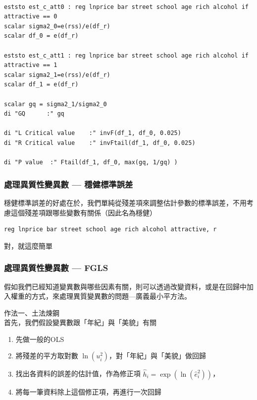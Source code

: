 \begin{frame}[fragile]
    \begin{lstlisting}
    
eststo est_c_att0 : reg lnprice bar street school age rich alcohol if attractive == 0
scalar sigma2_0=e(rss)/e(df_r)
scalar df_0 = e(df_r)

eststo est_c_att1 : reg lnprice bar street school age rich alcohol if attractive == 1
scalar sigma2_1=e(rss)/e(df_r)
scalar df_1 = e(df_r)

scalar gq = sigma2_1/sigma2_0
di "GQ      :" gq

di "L Critical value    :" invF(df_1, df_0, 0.025)
di "R Critical value    :" invFtail(df_1, df_0, 0.025)

di "P value  :" Ftail(df_1, df_0, max(gq, 1/gq) )
    \end{lstlisting}

\end{frame}

\begin{frame}[fragile]
    \frametitle{處理異質性變異數 --- 穩健標準誤差}

    穩健標準誤差的好處在於，我們單純從殘差項來調整估計參數的標準誤差，不用考慮這個殘差項跟哪些變數有關係（因此名為穩健）

\begin{lstlisting}
reg lnprice bar street school age rich alcohol attractive, r 
\end{lstlisting}
\vfill
對，就這麼簡單
\end{frame}

\begin{frame}
        \begin{table}
            \centering
            \scalebox{0.7}{
            
            }
        \end{table}
\end{frame}

\begin{frame}
    \frametitle{處理異質性變異數 --- FGLS}
    假如我們已經知道變異數與哪些因素有關，則可以透過改變資料，或是在回歸中加入權重的方式，來處理異質變異數的問題---廣義最小平方法。

    作法一、土法煉鋼\\
    首先，我們假設變異數跟「年紀」與「美貌」有關
    \begin{enumerate}
        \item 先做一般的OLS
        \item 將殘差的平方取對數 $\ln(u_i^2)$，對「年紀」與「美貌」做回歸
        \item 找出各資料的誤差的估計值，作為修正項 $\hat{h}_i = \exp(\ln(\hat{e}_i^2))$，
        \item 將每一筆資料除上這個修正項，再進行一次回歸
    \end{enumerate}
\end{frame}

